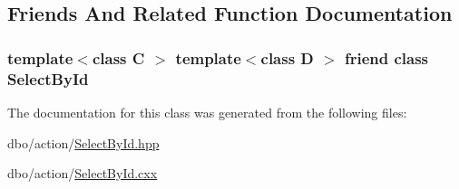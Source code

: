 \subsection{Friends And Related Function Documentation}
\hypertarget{classdbo_1_1action_1_1_select_by_id_a9952e8f41a3fb1af7b01c5ed0892a551}{
\subsubsection[{Select\+By\+Id}]{\setlength{\rightskip}{0pt plus 5cm}template$<$class C $>$ template$<$class D $>$ friend class {\bf Select\+By\+Id}\hspace{0.3cm}{\ttfamily [friend]}}}\label{classdbo_1_1action_1_1_select_by_id_a9952e8f41a3fb1af7b01c5ed0892a551}


The documentation for this class was generated from the following files\+:\begin{DoxyCompactItemize}
\item 
dbo/action/\hyperlink{_select_by_id_8hpp}{Select\+By\+Id.\+hpp}\item 
dbo/action/\hyperlink{_select_by_id_8cxx}{Select\+By\+Id.\+cxx}\end{DoxyCompactItemize}
